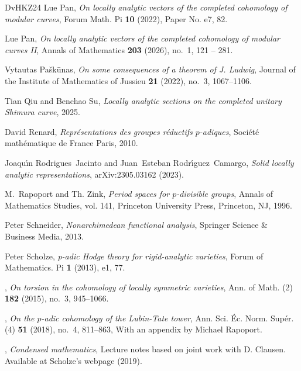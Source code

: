 \documentclass{article}
\theoremstyle{definition}
\begin{document}
\begin{thebibliography}{DvHKZ24}
Lue Pan, \emph{On locally analytic vectors of the completed cohomology of modular curves}, Forum Math. Pi \textbf{10} (2022), Paper No. e7, 82. 

Lue Pan, \emph{{On locally analytic vectors of the completed cohomology of modular curves II}}, Annals of Mathematics \textbf{203} (2026), no.~1, 121 -- 281.

Vytautas Pa{\v{s}}k{\=u}nas, \emph{{On some consequences of a theorem of J. Ludwig}}, Journal of the Institute of Mathematics of Jussieu \textbf{21} (2022), no.~3, 1067--1106.

Tian Qiu and Benchao Su, \emph{{Locally analytic sections on the completed unitary Shimura curve}}, 2025.

David Renard, \emph{{Repr{\'e}sentations des groupes r{\'e}ductifs $p$-adiques}}, Soci{\'e}t{\'e} math{\'e}matique de France Paris, 2010.

Joaqu{\'\i}n Rodrigues~Jacinto and Juan~Esteban Rodr{\'\i}guez~Camargo, \emph{Solid locally analytic representations}, arXiv:2305.03162 (2023).

M.~Rapoport and Th. Zink, \emph{Period spaces for {$p$}-divisible groups}, Annals of Mathematics Studies, vol. 141, Princeton University Press, Princeton, NJ, 1996. 

Peter Schneider, \emph{Nonarchimedean functional analysis}, Springer Science \& Business Media, 2013.

Peter Scholze, \emph{p-adic {Hodge} theory for rigid-analytic varieties}, Forum of Mathematics. Pi \textbf{1} (2013), e1, 77. 

\bysame, \emph{On torsion in the cohomology of locally symmetric varieties}, Ann. of Math. (2) \textbf{182} (2015), no.~3, 945--1066. 

\bysame, \emph{On the {$p$}-adic cohomology of the {L}ubin-{T}ate tower}, Ann. Sci. \'{E}c. Norm. Sup\'{e}r. (4) \textbf{51} (2018), no.~4, 811--863, With an appendix by Michael Rapoport. 

\bysame, \emph{Condensed mathematics}, Lecture notes based on joint work with D. Clausen. Available at Scholze’s webpage (2019).


\end{thebibliography}
\end{document}

